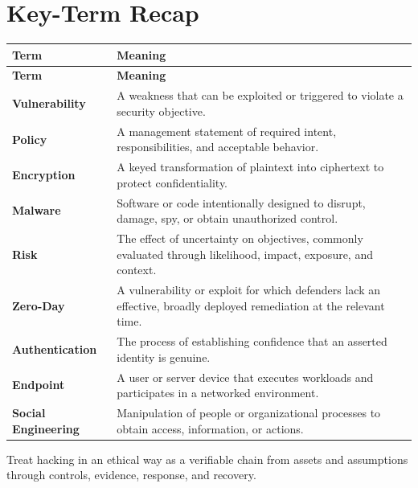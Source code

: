 \documentclass[11pt]{article}
\begin{document}
\section*{Key-Term Recap}
\begin{longtable}{>{\RaggedRight\arraybackslash}p{}>{\RaggedRight\arraybackslash}p{}}
\toprule\rowcolor{Navy}\color{white}\textbf{Term} & \color{white}\textbf{Meaning}\\\midrule
\endfirsthead
\toprule\rowcolor{Navy}\color{white}\textbf{Term} & \color{white}\textbf{Meaning}\\\midrule
\endhead
\textbf{Vulnerability} & A weakness that can be exploited or triggered to violate a security objective. \\\midrule
\textbf{Policy} & A management statement of required intent, responsibilities, and acceptable behavior. \\\midrule
\textbf{Encryption} & A keyed transformation of plaintext into ciphertext to protect confidentiality. \\\midrule
\textbf{Malware} & Software or code intentionally designed to disrupt, damage, spy, or obtain unauthorized control. \\\midrule
\textbf{Risk} & The effect of uncertainty on objectives, commonly evaluated through likelihood, impact, exposure, and context. \\\midrule
\textbf{Zero-Day} & A vulnerability or exploit for which defenders lack an effective, broadly deployed remediation at the relevant time. \\\midrule
\textbf{Authentication} & The process of establishing confidence that an asserted identity is genuine. \\\midrule
\textbf{Endpoint} & A user or server device that executes workloads and participates in a networked environment. \\\midrule
\textbf{Social Engineering} & Manipulation of people or organizational processes to obtain access, information, or actions. \\\midrule
\bottomrule
\end{longtable}
\begin{takeawaybox}
Treat hacking in an ethical way as a verifiable chain from assets and assumptions through controls, evidence, response, and recovery.
\end{takeawaybox}
\end{document}
